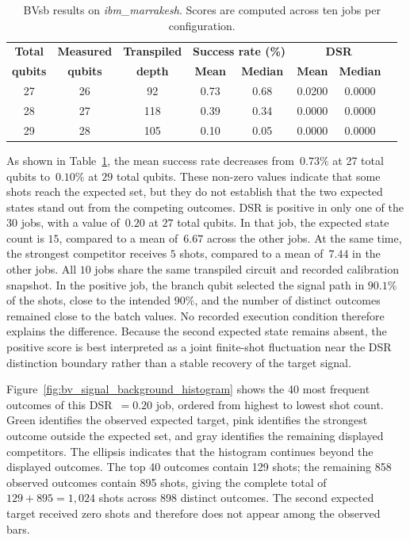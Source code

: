 \documentclass[10pt,conference]{IEEEtran}
\begin{document}
\begin{table}[ht!]
  \centering
  \caption{BVsb results on \textit{ibm\_marrakesh}. Scores are computed across ten jobs per configuration.}
  \label{tab:bv_signal_background}
  \begin{tabular}{cccccccc}
  \hline
  \textbf{Total} & \textbf{Measured} & \textbf{Transpiled} & \multicolumn{2}{c}{\textbf{Success rate (\%)}} & \multicolumn{2}{c}{\textbf{DSR}} \\
  \textbf{qubits} & \textbf{qubits} & \textbf{depth} & \textbf{Mean} & \textbf{Median} & \textbf{Mean} & \textbf{Median} \\
  \hline
  27 & 26 & 92  & 0.73 & 0.68 & 0.0200 & 0.0000 \\
  28 & 27 & 118 & 0.39 & 0.34 & 0.0000 & 0.0000 \\
  29 & 28 & 105 & 0.10 & 0.05 & 0.0000 & 0.0000 \\
  \hline
  \end{tabular}
\end{table}

As shown in Table~\ref{tab:bv_signal_background}, the mean success rate decreases from~$0.73\%$ at 27 total qubits to~$0.10\%$ at $29$ total qubits. These non-zero values indicate that some shots reach the expected set, but they do not establish that the two expected states stand out from the competing outcomes. DSR is positive in only one of the $30$ jobs, with a value of~$0.20$ at $27$ total qubits. In that job, the expected state count is $15$, compared to a mean of~$6.67$ across the other jobs. At the same time, the strongest competitor receives $5$ shots, compared to a mean of~$7.44$ in the other jobs. All $10$ jobs share the same transpiled circuit and recorded calibration snapshot. In the positive job, the branch qubit selected the signal path in $90.1\%$ of the shots, close to the intended $90\%$, and the number of distinct outcomes remained close to the batch values. No recorded execution condition therefore explains the difference. Because the second expected state remains absent, the positive score is best interpreted as a joint finite-shot fluctuation near the DSR distinction boundary rather than a stable recovery of the target signal.

Figure~\ref{fig:bv_signal_background_histogram} shows the 40 most frequent outcomes of this DSR~$=0.20$ job, ordered from highest to lowest shot count. Green identifies the observed expected target, pink identifies the strongest outcome outside the expected set, and gray identifies the remaining displayed competitors. The ellipsis indicates that the histogram continues beyond the displayed outcomes. The top 40 outcomes contain 129 shots; the remaining 858 observed outcomes contain 895 shots, giving the complete total of $129+895=1{,}024$ shots across 898 distinct outcomes. The second expected target received zero shots and therefore does not appear among the observed bars.
\end{document}
